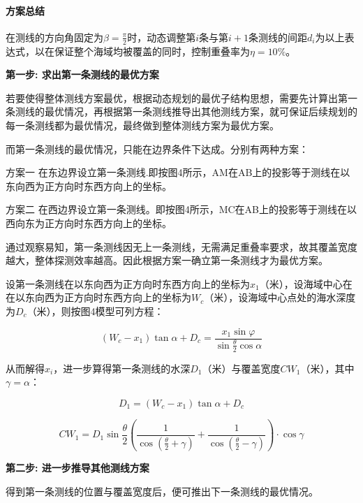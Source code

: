\paragraph{方案总结}

在测线的方向角固定为$\beta = \frac{\pi}{2}$时，动态调整第$i$条与第$i + 1$条测线的间距$d_i$为以上表达式，以在保证整个海域均被覆盖的同时，控制重叠率为$\eta = 10\%$。


\textbf{第一步: 求出第一条测线的最优方案}

若要使得整体测线方案最优，根据动态规划的最优子结构思想，需要先计算出第一条测线的最优情况，再根据第一条测线推导出其他测线方案，就可保证后续规划的每一条测线都为最优情况，最终做到整体测线方案为最优方案。

而第一条测线的最优情况，只能在边界条件下达成。分别有两种方案：

方案一 在东边界设立第一条测线.即按图4所示，AM在AB上的投影等于测线在以东向西为正方向时东西方向上的坐标。

方案二 在西边界设立第一条测线。即按图4所示，MC在AB上的投影等于测线在以西向东为正方向时东西方向上的坐标。

通过观察易知，第一条测线因无上一条测线，无需满足重叠率要求，故其覆盖宽度越大，整体探测效率越高。因此根据方案一确立第一条测线才为最优方案。

设第一条测线在以东向西为正方向时东西方向上的坐标为$x_1$（米），设海域中心在在以东向西为正方向时东西方向上的坐标为$W_c$（米），设海域中心点处的海水深度为$D_c$（米），则按图4模型可列方程：

\begin{equation}
    (W_c - x_1) \tan\alpha+D_c = \frac{x_1\sin \varphi}{\sin \frac{\theta}{2} \cos \alpha} 
\end{equation}

从而解得$x_i$，进一步算得第一条测线的水深$D_1$（米）与覆盖宽度$CW_1$（米），其中$\gamma = \alpha$：

\begin{equation}
    D_1 =  (W_c - x_1) \tan{\alpha} + D_c
\end{equation}

\begin{equation}
    CW_1 = D_1\sin\frac{\theta}{2}\left(\frac{1}{\cos(\frac{\theta}{2}+\gamma)} + \frac{1}{\cos(\frac{\theta}{2}-\gamma)}\right) \cdot \cos \gamma
\end{equation}

\textbf{第二步: 进一步推导其他测线方案}

得到第一条测线的位置与覆盖宽度后，便可推出下一条测线的最优情况。

